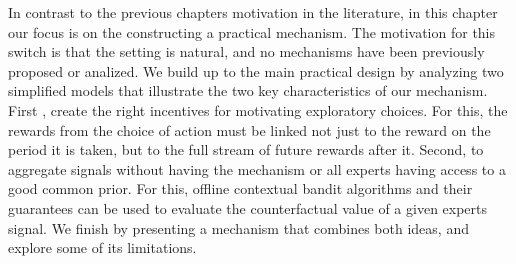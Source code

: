  


In contrast to the previous chapters motivation in the literature, in this chapter our focus is on the constructing a practical mechanism. 
The motivation for this switch is that the setting is natural, and no mechanisms have been previously proposed or analized.
We build up to the main practical design by analyzing two simplified models that illustrate the two key characteristics of our mechanism. 
First , create the right incentives for motivating exploratory choices. For this, the rewards from the choice of action must be linked not just to the reward on the period it is taken, but to the full stream of future rewards after it.
Second, to aggregate signals without having the mechanism or all  experts having access to a good common prior. For this, offline contextual bandit algorithms and their guarantees can be used to evaluate the counterfactual value of a given experts signal.
We finish by presenting a mechanism that combines both ideas, and explore some of its limitations.










